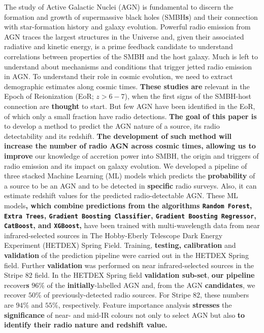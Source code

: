 \documentclass{aa}
\begin{document}
   \date{Received ; accepted }

 
  \abstract
   {The study of Active Galactic Nuclei (AGN) is fundamental to discern the formation and growth of supermassive black holes (SMBH\textbf{s}) and their connection with star-formation history and galaxy evolution. Powerful radio emission from AGN traces the largest structures in the Universe and, given their associated radiative and kinetic energy, is a prime feedback candidate to understand correlations between properties of the SMBH and the host galaxy. Much is left to understand about mechanisms and conditions that trigger jetted radio emission in AGN. To understand their role in cosmic evolution, we need to extract demographic estimates along cosmic times. \textbf{These studies are} relevant in the Epoch of Reionization (EoR; ${z{>}6-7}$), when the first signs of the SMBH-host connection are \textbf{thought} to start. But few AGN have been identified in the EoR, of which only a small fraction have radio detections.
   }
   {\textbf{The goal of this paper is} to develop a method to predict the AGN nature of a source, its radio detectability and its redshift. \textbf{The development of such method will increase the number of radio AGN across cosmic times, allowing us to improve} our knowledge of accretion power into SMBH, the origin and triggers of radio emission and its impact on galaxy evolution.   
   }
   {We developed a pipeline of three stacked Machine Learning (ML) models which predicts the \textbf{probability} of a source to be an AGN and to be detected in \textbf{specific} radio surveys. Also, it can estimate redshift values for the predicted radio-detectable AGN. These ML models\textbf{, which combine predictions from the algorithms \texttt{Random Forest}, \texttt{Extra Trees}, \texttt{Gradient Boosting Classifier}, \texttt{Gradient Boosting Regressor}, \texttt{CatBoost}, and \texttt{XGBoost},} have been trained with multi-wavelength data from near infrared-selected sources in The Hobby-Eberly Telescope Dark Energy Experiment (HETDEX) Spring Field. Training, \textbf{testing, calibration} and \textbf{validation} of the prediction pipeline were carried out in the HETDEX Spring field. Further \textbf{validation} was performed on near infrared-selected sources in the Stripe 82 field.
   }
   {In the HETDEX Spring field \textbf{validation sub-set}, \textbf{our pipeline} recover\textbf{s} $96\%$ of the \textbf{initially}-labelled AGN and, from the AGN \textbf{candidates}, we recover $50\%$ of previously-detected radio sources. For Stripe 82, these numbers are $94\%$ and $55\%$, respectively. Feature importance analysis \textbf{stresses} the \textbf{significance} of near- and mid-IR colours not only to select AGN but also \textbf{to identify their radio nature and redshift value.}
   }
\end{document}
